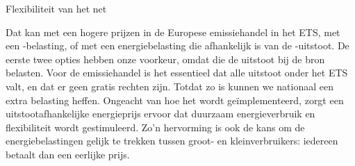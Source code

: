 \begin{voorstel}{Flexibiliteit van het net}
\begin{multicols*}{2}
\begin{aanbevelingen}

 Dat kan met een hogere prijzen in de Europese emissiehandel in het ETS, met een \COO-belasting, of met een energiebelasting die afhankelijk is van de \COO-uitstoot. De eerste twee opties hebben onze voorkeur, omdat die de uitstoot bij de bron belasten. Voor de emissiehandel is het essentieel dat alle uitstoot onder het ETS valt, en dat er geen gratis rechten zijn. Totdat zo is kunnen we nationaal een extra belasting heffen. Ongeacht van hoe het wordt geïmplementeerd, zorgt een uitstootafhankelijke energieprijs ervoor dat duurzaam energieverbruik en flexibiliteit wordt gestimuleerd. Zo'n hervorming is ook de kans om de energiebelastingen gelijk te trekken tussen groot- en kleinverbruikers: iedereen betaalt dan een eerlijke prijs.
\end{aanbevelingen}

\end{multicols*}

\end{voorstel}
